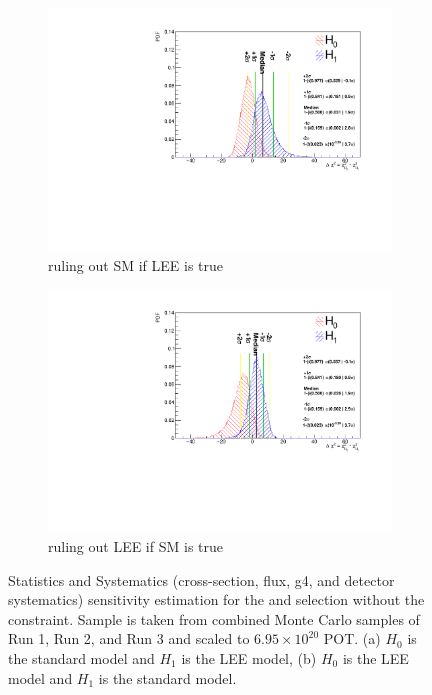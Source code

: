 \begin{figure}[H]
    \centering
    \begin{subfigure}[b]{0.48\textwidth}
    \centering
    \includegraphics[width=1.00\textwidth]{Sensitivity/sensitivity-run123/SBNfit_Cls_nue_1e0p_reco_e_H1_mc_collab_syst_detsysCNP_Chi.pdf}
    \caption{ruling out SM if LEE is true}
    \end{subfigure}
    \begin{subfigure}[b]{0.48\textwidth}
    \centering
    \includegraphics[width=1.00\textwidth]{Sensitivity/sensitivity-run123/SBNfit_Cls_nue_1e0p_reco_e_H1_mc_collab_syst_detsys_exclusionCNP_Chi.pdf}
    \caption{ruling out LEE if SM is true}
    \end{subfigure}
    \caption{Statistics and Systematics (cross-section, flux, g4, and detector systematics) sensitivity estimation for the \npsel and \zpsel selection without the \numu constraint. Sample is taken from combined Monte Carlo samples of Run 1, Run 2, and Run 3 and scaled to $6.95\times10^20$ POT.  (a) $H_0$ is the standard model and $H_1$ is the LEE model, (b) $H_0$ is the LEE model and $H_1$ is the standard model.}
    \label{fig:1eNp:BDT:statsystsensitivityrun1to3}
\end{figure}

